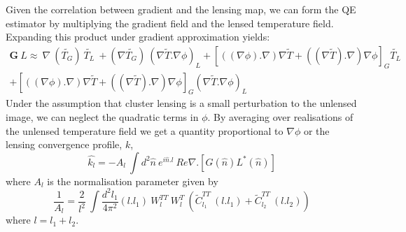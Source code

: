  Given the correlation between gradient and the lensing map, we can form the QE estimator by multiplying the gradient field and the lensed temperature field.
 Expanding this product under gradient approximation yields:
 \begin{equation}
 \begin{split}
 \textbf{G} \: L \approx \: \nabla \: (\widetilde{T_{G}}) \: \widetilde{T_{L}} \: + (\nabla \widetilde{T_{G}}) \: (\nabla \widetilde{T}.\nabla \phi)_{L}   + [((\nabla \phi). \nabla) \nabla\widetilde{T} + ((\nabla \widetilde{T}). \nabla) \nabla{\phi}]_{G} \widetilde{T_{L}} \\
 + [((\nabla \phi). \nabla) \nabla\widetilde{T} + ((\nabla \widetilde{T}). \nabla) \nabla{\phi}]_{G} (\nabla \widetilde{T} .\nabla \phi)_{L}%
\end{split}
 \end{equation}
  Under the assumption that cluster lensing is a small perturbation to the unlensed image, we can neglect the quadratic terms in $\phi$.
  By averaging over realisations of the unlensed temperature field we get a quantity proportional to $\nabla \phi$ or the lensing convergence profile, $k$,
 \begin{equation}
 \hat{k_{l}} = -A_{l} \: \int d^{2}\hat{n} \: e^{i\hat{n}.l} \:Re{\nabla .[G(\hat{n}) L^{*}(\hat{n})]}
 \label{mqe_convergence_eqn}
 \end{equation}
 where $A_{l}$ is the normalisation parameter given by
 \begin{equation}
 \frac{1}{A_{l}} = \frac{2}{l^{2}} \: \int \frac{d^{2}l_{1}}{4\pi^{2}} (l.l_{1}) \: W^{TT}_{l} \: W^{T}_{l} \: (\tilde{C}^{TT}_{l_{1}}\: (l.l_{1}) + \tilde{C}^{TT}_{l_{2}}\: (l.l_{2}))
 \end{equation}
 where $l = l_{1}  + l_{2}$. 
